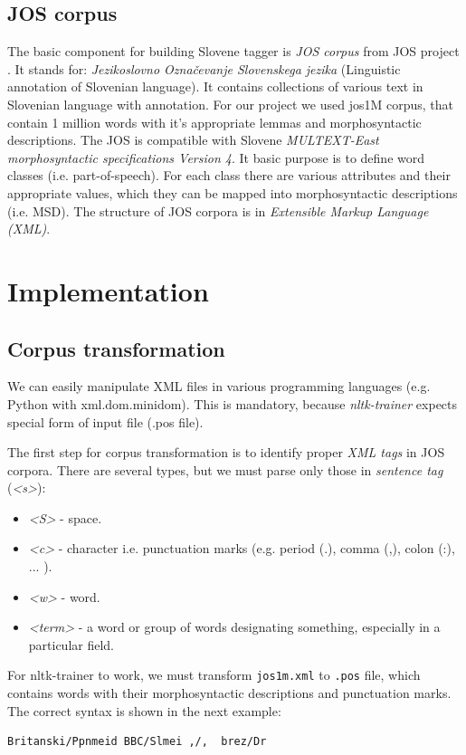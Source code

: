 \documentclass[10pt, conference, compsocconf]{IEEEtran}
\begin{document}
\subsection{JOS corpus} %
The basic component for building Slovene tagger is \textit{JOS corpus} from JOS project \cite{JOS}. It stands for: \textit{Jezikoslovno Označevanje Slovenskega jezika} (Linguistic annotation of Slovenian language).
It contains collections of various text in Slovenian language with annotation.
For our project we used jos1M corpus, that contain 1 million words with it's appropriate lemmas and morphosyntactic descriptions.
The JOS is compatible with Slovene\textit{ MULTEXT-East morphosyntactic specifications Version 4}\cite{MULTEXT-East}.
It basic purpose is to define word classes (i.e. part-of-speech).
For each class there are various attributes and their appropriate values, which they can be mapped into morphosyntactic descriptions (i.e. MSD).
The structure of JOS corpora is in  \textit{Extensible Markup Language (XML)}.

\section{Implementation}
\label{implementation}
\subsection{Corpus transformation} %
\label{Corpus transformation} 

We can easily manipulate XML files in various programming languages (e.g. Python with xml.dom.minidom).
This is mandatory, because \textit{nltk-trainer}\cite{nltk-trainer} expects special form of input file (.pos file).

The first step for corpus transformation is to identify proper \textit{XML tags}\cite{xml_tags} in JOS corpora. There are several types, but we must parse only those in \textit{sentence tag }(\textit{<s>}):
\begin{itemize}
\item \textit{<S>} - space.
\item \textit{<c>} - character i.e. punctuation marks (e.g. period (.), comma (,), colon (:), ... ).
\item \textit{<w>} - word.
\item \textit{<term>} - a word or group of words designating something, especially in a particular field. 
\end{itemize}

For nltk-trainer to work, we must transform \texttt{jos1m.xml} to \texttt{.pos} file, which contains words with their morphosyntactic descriptions and punctuation marks. The correct syntax is shown in the next example:
\begin{lstlisting}
Britanski/Ppnmeid BBC/Slmei ,/,  brez/Dr 
\end{lstlisting}
\end{document}
